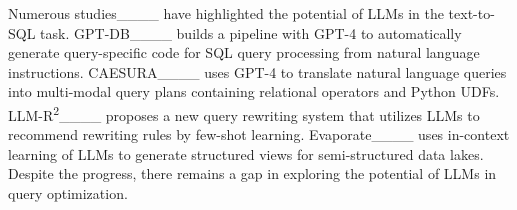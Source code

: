 Numerous studies____ have highlighted the potential of LLMs in the text-to-SQL task. 
GPT-DB____ builds a pipeline with GPT-4 to automatically generate query-specific code for SQL query processing from natural language instructions. 
CAESURA____ uses GPT-4 to translate natural language queries into multi-modal query plans containing relational operators and Python UDFs.
LLM-R\textsuperscript{2}____ proposes a new query rewriting system that utilizes LLMs to recommend rewriting rules by few-shot learning.
Evaporate____ uses in-context learning of LLMs to generate structured views for semi-structured data lakes. 
Despite the progress, there remains a gap in exploring the potential of LLMs in query optimization. 

